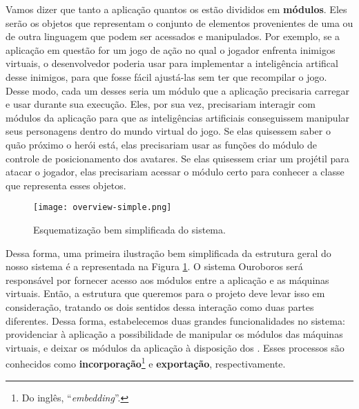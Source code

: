     Vamos dizer que tanto a aplicação quantos os  estão divididos
    em \textbf{módulos}. Eles serão os objetos que representam o conjunto de
    elementos provenientes de uma ou de outra linguagem que podem ser acessados
    e manipulados. Por exemplo, se a aplicação em questão for um jogo de ação no
    qual o jogador enfrenta inimigos virtuais, o desenvolvedor poderia usar
     para implementar a inteligência artifical desse inimigos, para
    que fosse fácil ajustá-las sem ter que recompilar o jogo. Desse modo, cada
    um desses  seria um módulo que a aplicação precisaria carregar e
    usar durante sua execução. Eles, por sua vez, precisariam interagir com
    módulos da aplicação para que as inteligências artificiais conseguissem
    manipular seus personagens dentro do mundo virtual do jogo. Se elas
    quisessem saber o quão próximo o herói está, elas precisariam usar as
    funções do módulo de controle de posicionamento dos avatares. Se elas
    quisessem criar um projétil para atacar o jogador, elas precisariam acessar
    o módulo certo para conhecer a classe que representa esses objetos.

    \begin{figure}[ht]
      \centering
      \texttt{[image: overview-simple.png]}
      \caption{Esquematização bem simplificada do sistema.}
      \label{fig:overview-simple}
    \end{figure}

    Dessa forma, uma primeira ilustração bem simplificada da estrutura geral do
    nosso sistema é a representada na Figura \ref{fig:overview-simple}. O
    sistema Ouroboros será responsável por fornecer acesso aos módulos entre a
    aplicação e as máquinas virtuais. Então, a estrutura que queremos para o
    projeto deve levar isso em consideração, tratando os dois sentidos dessa
    interação como duas partes diferentes. Dessa forma, estabelecemos duas
    grandes funcionalidades no sistema: providenciar à aplicação a possibilidade
    de manipular os módulos das máquinas virtuais, e deixar os módulos da
    aplicação à disposição dos  . Esses processos são conhecidos como
    \textbf{incorporação}\footnote{Do inglês, ``\textit{embedding}''.} e
    \textbf{exportação}, respectivamente.


